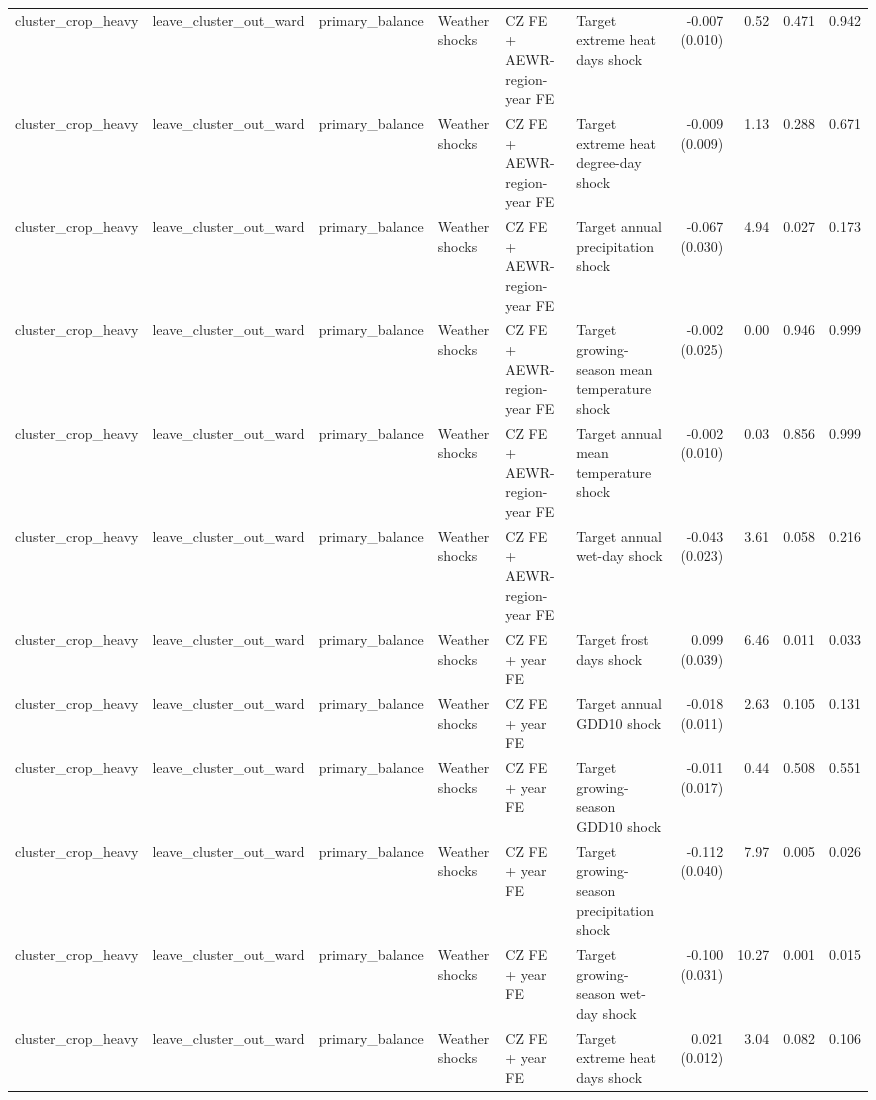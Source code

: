 \begin{tabular}{llllllrrrr}
cluster_crop_heavy & leave_cluster_out_ward & primary_balance & Weather shocks & CZ FE + AEWR-region-year FE & Target extreme heat days shock & -0.007 (0.010) & 0.52 & 0.471 & 0.942 \\
cluster_crop_heavy & leave_cluster_out_ward & primary_balance & Weather shocks & CZ FE + AEWR-region-year FE & Target extreme heat degree-day shock & -0.009 (0.009) & 1.13 & 0.288 & 0.671 \\
cluster_crop_heavy & leave_cluster_out_ward & primary_balance & Weather shocks & CZ FE + AEWR-region-year FE & Target annual precipitation shock & -0.067 (0.030) & 4.94 & 0.027 & 0.173 \\
cluster_crop_heavy & leave_cluster_out_ward & primary_balance & Weather shocks & CZ FE + AEWR-region-year FE & Target growing-season mean temperature shock & -0.002 (0.025) & 0.00 & 0.946 & 0.999 \\
cluster_crop_heavy & leave_cluster_out_ward & primary_balance & Weather shocks & CZ FE + AEWR-region-year FE & Target annual mean temperature shock & -0.002 (0.010) & 0.03 & 0.856 & 0.999 \\
cluster_crop_heavy & leave_cluster_out_ward & primary_balance & Weather shocks & CZ FE + AEWR-region-year FE & Target annual wet-day shock & -0.043 (0.023) & 3.61 & 0.058 & 0.216 \\
cluster_crop_heavy & leave_cluster_out_ward & primary_balance & Weather shocks & CZ FE + year FE & Target frost days shock & 0.099 (0.039) & 6.46 & 0.011 & 0.033 \\
cluster_crop_heavy & leave_cluster_out_ward & primary_balance & Weather shocks & CZ FE + year FE & Target annual GDD10 shock & -0.018 (0.011) & 2.63 & 0.105 & 0.131 \\
cluster_crop_heavy & leave_cluster_out_ward & primary_balance & Weather shocks & CZ FE + year FE & Target growing-season GDD10 shock & -0.011 (0.017) & 0.44 & 0.508 & 0.551 \\
cluster_crop_heavy & leave_cluster_out_ward & primary_balance & Weather shocks & CZ FE + year FE & Target growing-season precipitation shock & -0.112 (0.040) & 7.97 & 0.005 & 0.026 \\
cluster_crop_heavy & leave_cluster_out_ward & primary_balance & Weather shocks & CZ FE + year FE & Target growing-season wet-day shock & -0.100 (0.031) & 10.27 & 0.001 & 0.015 \\
cluster_crop_heavy & leave_cluster_out_ward & primary_balance & Weather shocks & CZ FE + year FE & Target extreme heat days shock & 0.021 (0.012) & 3.04 & 0.082 & 0.106 \\

\end{tabular}
